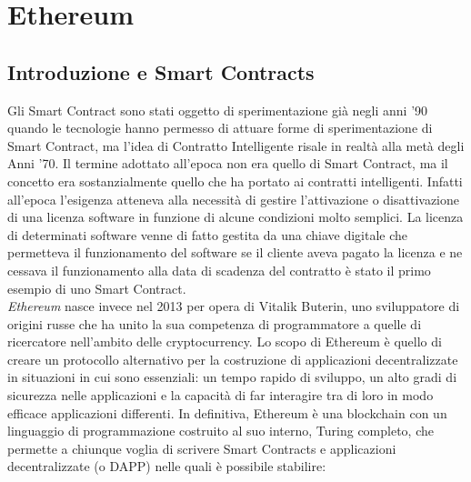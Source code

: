 %
%
\chapter{Ethereum}
%
\label{cap:ethereum}
%
%
\section{Introduzione e Smart Contracts}
%
Gli Smart Contract sono stati oggetto di sperimentazione già negli anni ’90 quando le tecnologie hanno permesso di attuare forme di sperimentazione di Smart Contract, ma l’idea di Contratto Intelligente risale in realtà alla metà degli Anni ’70. Il termine adottato all’epoca non era quello di Smart Contract, ma il concetto era sostanzialmente quello che ha portato ai contratti intelligenti. Infatti all’epoca l’esigenza atteneva alla necessità di gestire l'attivazione o disattivazione di una licenza software in funzione di alcune condizioni molto semplici. La licenza di determinati software venne di fatto gestita da una chiave digitale che permetteva il funzionamento del software se il cliente aveva pagato la licenza e ne cessava il funzionamento alla data di scadenza del contratto è stato il primo esempio di uno Smart Contract. \\
\emph{Ethereum}\autocite{eth} nasce invece nel 2013 per opera di Vitalik Buterin, uno sviluppatore di origini russe che ha unito la sua competenza di programmatore a quelle di ricercatore nell’ambito delle cryptocurrency. Lo scopo di Ethereum è quello di creare un protocollo alternativo per la costruzione di applicazioni decentralizzate in situazioni in cui sono essenziali: un tempo rapido di sviluppo, un alto gradi di sicurezza nelle applicazioni e la capacità di far interagire tra di loro in modo efficace applicazioni differenti. In definitiva, Ethereum è una blockchain con un linguaggio di programmazione costruito al suo interno, Turing completo, che permette a chiunque voglia di scrivere Smart Contracts e applicazioni decentralizzate (o DAPP) nelle quali è possibile stabilire:
